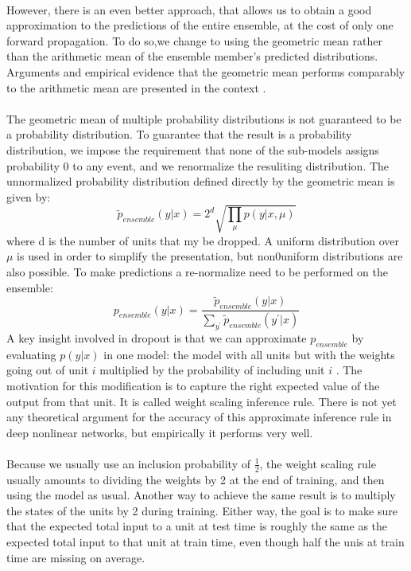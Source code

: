 \paragraph{}
However, there is an even better approach, that allows us to obtain a good approximation to the predictions of the entire ensemble, at the cost of only one forward propagation.
To do so,we change to using the geometric mean rather than the arithmetic mean of the ensemble member's predicted distributions.
Arguments and empirical evidence that the geometric mean performs comparably to the arithmetic mean are presented in the context \cite {WardeFarley2014SelfinformedNN}.
\paragraph{}
The geometric mean of multiple probability distributions is not guaranteed to be a probability distribution.
To guarantee that the result is a probability distribution, we impose the requirement that none of the sub-models assigns probability 0 to any event, and we renormalize the resuliting distribution.
The unnormalized probability distribution defined directly by the geometric mean is given by:
\begin{equation}
    \tilde{p}_{ensemble}(y|x) = 2^d \sqrt{\prod_\mu p(y|x,\mu)}
\end{equation}
where d is the number of units that my be dropped.
A uniform distribution over $\mu$ is used in order to simplify the presentation, but non0uniform distributions are also possible.
To make predictions a re-normalize need to be performed on the ensemble:
\begin{equation}
    p_{ensemble}(y|x) = \frac{
        \tilde{p}_{ensemble}(y|x)
    }{
        \sum_{y^\prime} \tilde{p}_{ensemble}(y^\prime|x)
    }
\end{equation}
A key insight involved in dropout is that we can approximate $p_{ensemble}$ by evaluating $p(y|x)$ in one model: the model with all units but with the weights going out of unit $i$ multiplied by the probability of including unit $i$ \cite{hinton2012}.
The motivation for this modification is to capture the right expected value of the output from that unit.
It is called weight scaling inference rule.
There is not yet any theoretical argument for the accuracy of this approximate inference rule in deep nonlinear networks, but empirically it performs very well.
\paragraph{}
Because we usually use an inclusion probability of $\frac{1}{2}$, the weight scaling rule usually amounts to dividing the weights by 2 at the end of training, and then using the model as usual.
Another way to achieve the same result is to multiply the states of the units by 2 during training.
Either way, the goal is to make sure that the expected total input to a unit at test time is roughly the same as the expected total input to that unit at train time, even though half the unis at train time are missing on average.
